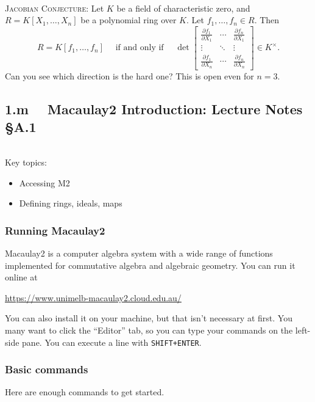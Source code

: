 \documentclass[12pt]{amsart}
\newcommand{\0}{$\phantom{.}$}
\newcommand{\1}{\mathbbm{1}}
\begin{document}
\

\noindent \textsc{Jacobian Conjecture:} Let $K$ be a field of characteristic zero, and $R=K[X_1,\dots,X_n]$ be a polynomial ring over $K$. Let $f_1,\dots,f_n\in R$. Then 
\vspace{-5mm}
\[ R=K[f_1,\dots,f_n] \quad \text{ if and only if } \quad \det \begin{bmatrix} \frac{\partial f_1}{\partial X_1} & \cdots & \frac{\partial f_n}{\partial X_1} \\
\vdots & \ddots & \vdots \\
 \frac{\partial f_1}{\partial X_n} & \cdots & \frac{\partial f_n}{\partial X_n} \end{bmatrix} \in K^\times.\]
Can you see which direction is the hard one? This is open even for $n=3$.

\newpage



\subsection*{1.m \, \, Macaulay2 Introduction:  Lecture Notes \S A.1} \0

\begin{framed} Key topics:
\begin{itemize}
\item Accessing M2
\item Defining rings, ideals, maps
\end{itemize}
\end{framed}

\subsubsection*{Running Macaulay2} Macaulay2 is a computer algebra system with a wide range of functions implemented for commutative algebra and algebraic geometry. You can run it online at

\begin{center} \url{https://www.unimelb-macaulay2.cloud.edu.au/} \end{center}

\noindent You can also install it on your machine, but that isn't necessary at first. You many want to click the ``Editor'' tab, so you can type your commands on the left-side pane. You can execute a line with \texttt{SHIFT+ENTER}.


\subsubsection*{Basic commands} Here are enough commands to get started.
\end{document}
